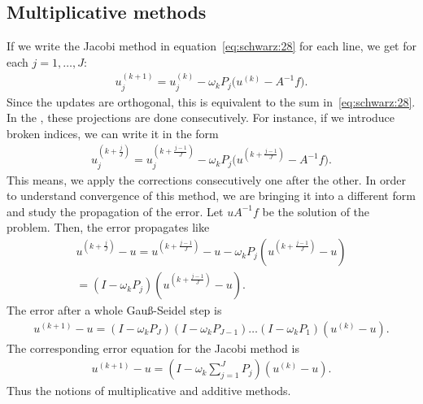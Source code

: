 \subsection{Multiplicative methods}

\begin{example}
  If we write the Jacobi method in equation~\eqref{eq:schwarz:28} for
  each line, we get for each $j=1,\ldots,J$:
  \begin{gather}
    \label{eq:schwarz:29}
      u_j^{(k+1)} = u_j^{(k)} - \omega_k P_j \bigl(u^{(k)} - A^{-1}f\bigr).
  \end{gather}
  Since the updates are orthogonal, this is equivalent to the sum
  in~\eqref{eq:schwarz:28}. In the , these
  projections are done consecutively. For instance, if we introduce
  broken indices, we can write it in the form
  \begin{gather}
    \label{eq:schwarz:30}
      u_j^{(k+\frac{j}{J})} = u_j^{(k+\frac{j-1}{J})}
      - \omega_k P_j \bigl(u^{(k+\frac{j-1}{J})} - A^{-1}f\bigr).
  \end{gather}
  This means, we apply the corrections consecutively one after the
  other. In order to understand convergence of this method, we are
  bringing it into a different form and study the propagation of the
  error. Let $uA^{-1}f$ be the solution of the problem. Then, the
  error propagates like
  \begin{multline}
    \label{eq:schwarz:31}
      u^{(k+\frac{j}{J})} - u = u^{(k+\frac{j-1}{J})} - u
      - \omega_k P_j \left(u^{(k+\frac{j-1}{J})} - u\right) \\
      = (I-\omega_k P_j) \left(u^{(k+\frac{j-1}{J})} - u\right).
  \end{multline}
  The error after a whole Gauß-Seidel step is
  \begin{gather}
    \label{eq:schwarz:32}
      u^{(k+1)} - u
      = (I-\omega_k P_J)(I-\omega_k P_{J-1})\dots(I-\omega_k P_1) \left(u^{(k)} - u\right).
  \end{gather}
  The corresponding error equation for the Jacobi method is
  \begin{gather}
    \label{eq:schwarz:33}
    u^{(k+1)} - u = \left(I-\omega_k \sum_{j=1}^J P_j\right) \left(u^{(k)} - u\right).
  \end{gather}
  Thus the notions of multiplicative and additive methods.
\end{example}

